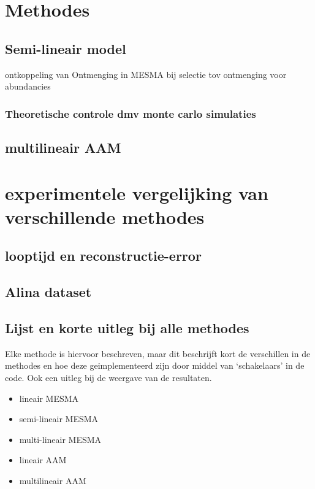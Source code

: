 \documentclass[12pt]{report}
\begin{document}
\chapter{Methodes}

\section{Semi-lineair model}

ontkoppeling van Ontmenging in MESMA bij selectie tov ontmenging voor abundancies

\subsection{Theoretische controle dmv monte carlo simulaties}

\section{multilineair AAM}

\chapter{experimentele vergelijking van verschillende methodes}

\section{looptijd en reconstructie-error}

\section{Alina dataset}

\section{Lijst en korte uitleg bij alle methodes}

Elke methode is hiervoor beschreven, maar dit beschrijft kort de verschillen in de methodes en hoe deze geimplementeerd zijn door middel van `schakelaars' in de code. Ook een uitleg bij de weergave van de resultaten. 

\begin{itemize}
\item lineair MESMA
\item semi-lineair MESMA
\item multi-lineair MESMA
\item lineair AAM
\item multilineair AAM
\end{itemize}
\end{document}
